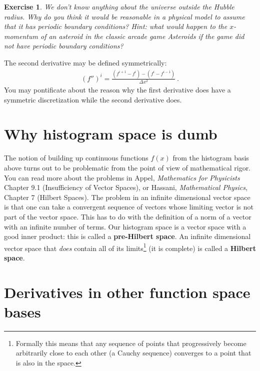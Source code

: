 \documentclass[
  11pt,
	colorful,
	raggedright,
]{tufte-style-thesis-flip}
\newtheorem{exercise}{Exercise}[section]
\begin{document}
\begin{exercise}
We don't know anything about the universe outside the Hubble radius. Why do you think it would be reasonable in a physical model to \emph{assume} that it has periodic boundary conditions? Hint: what would happen to the $x$-momentum of an asteroid in the classic arcade game \emph{Asteroids} if the game did not have periodic boundary conditions? 
\end{exercise}

The second derivative may be defined symmetrically:
\begin{align}
  (f'')^i = \frac{(f^{i+1} - f^i) - (f^i - f^{i-1})}{\Delta x^2} \ .
\end{align}
You may pontificate about the reason why the first derivative does have a symmetric discretization while the second derivative does. 


\section{Why histogram space is dumb}
\label{sec:histogram:space:is:dumb}

The notion of building up continuous functions $f(x)$ from the histogram basis above turns out to be problematic from the point of view of mathematical rigor. You can read more about the problems in Appel, \emph{Mathematics for Physicists} Chapter 9.1 (Insufficiency of Vector Spaces), or Hassani, \emph{Mathematical Physics}, Chapter 7 (Hilbert Spaces). The problem in an infinite dimensional vector space is that one can take a convergent sequence of vectors whose limiting vector is not part of the vector space. This has to do with the definition of a norm of a vector with an infinite number of terms. Our histogram space is a vector space with a good inner product: this is called a \textbf{pre-Hilbert space}. An infinite dimensional vector space that \emph{does} contain all of its limits\footnote{Formally this means that any sequence of points that progressively become arbitrarily close to each other (a Cauchy sequence) converges to a point that is also in the space.} (it is complete) is called a \textbf{Hilbert space}.



\section{Derivatives in other function space bases}
\label{sec:derivatives}
\end{document}
